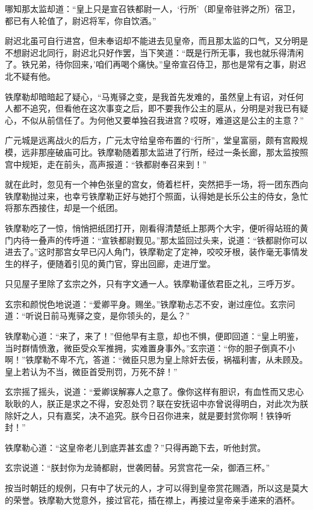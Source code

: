 \documentclass[12pt,oneside]{book}
\begin{document}
哪知那太监却道：``皇上只是宣召铁都尉一人，`行所'（即皇帝驻骅之所）宿卫，都已有人轮值了，尉迟将军，你自饮酒。''

尉迟北虽可自行进宫，但未奉诏却不能进去见皇帝，而且那太监的口气，又分明是不想尉迟北同行，尉迟北只好作罢，当下笑道：``既是行所无事，我也就乐得清闲了。铁兄弟，待你回来，'咱们再喝个痛快。''皇帝宣召侍卫，那也是常有之事，尉迟北不疑有他。

铁摩勒却暗暗起了疑心，``马嵬驿之变，是我首先发难的，虽然皇上有诏，对任何人都不追究，但看他在这次事变之后，即不要我作公主的扈从，分明是对我已有疑心，不似从前信任了。为何他又要单独召我进宫？哎呀，难道这是公主的主意？''

广元城是远离战火的后方，广元太守给皇帝布置的``行所''，堂皇富丽，颇有宫殿规模，远非那座破庙可比。铁摩勒随着那太监进了行所，经过一条长廊，那太监按照宫中规矩，走在前头，高声报道：``铁都尉奉召来到！''

就在此时，忽见有一个神色张皇的宫女，倚着栏杆，突然把手一场，将一团东西向铁摩勒抛过来，也幸亏铁摩勒正好与她打个照面，认得她是长乐公主的侍女，急忙将那东西接住，却是一个纸团。

铁摩勒吃了一惊，悄悄把纸团打开，刚看得清楚纸上那两个大宇，便听得站班的黄门内待一叠声的传呼道：``宣铁都尉觐见。''那太监回过头来，说道：``铁都尉你可以进去了。''这时那宫女早已闪人角门，铁摩勒定了定神，咬咬牙根，装作毫无事情发生的样子，便随着引见的黄门官，穿出回廊，走进厅堂。

只见屋子里除了玄宗之外，只有字文通一人。铁摩勒谨依君臣之礼，三呼万岁。

玄宗和颜悦色地说道：``爱卿平身。赐坐。''铁摩勒忐忑不安，谢过座位。玄宗问道：``听说日前马嵬驿之变，是你领头的，是么？''

铁摩勒心道：``来了，来了！''但他早有主意，却也不惧，便即回道：``皇上明鉴，当时群情愤激，微臣受众军推拥，实难置身事外。''玄宗道：``你的胆子倒真不小啊！''铁摩勒不卑不亢，答道：``微臣只思为皇上除奸去佞，祸福利害，从未顾及。皇上若认为不当，微臣首受刑罚，万死不辞！''

玄宗摇了摇头，说道：``爱卿误解寡人之意了。像你这样有胆识，有血性而又忠心耿耿的人，朕正是求之不得，安忍处罚？联在安抚诏中亦曾说得明白，对此次为朕除奸之人，只有嘉奖，决不追究。朕今日召你进来，就是要封赏你啊！铁铮听封！''

铁摩勒心道：``这皇帝老儿到底弄甚玄虚？''只得再跪下去，听他封赏。

玄宗说道：``朕封你为龙骑都尉，世袭罔替。另赏宫花一朵，御酒三杯。''

按当时朝廷的规例，只有中了状元的人，才可以得到皇帝赏花赐酒，所以这是莫大的荣誉。铁摩勒大觉意外，接过官花，插在襟上，再接过皇帝亲手递来的酒杯。
\end{document}
